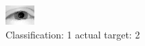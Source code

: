\begin{figure}[h!]
\begin{center}
\includegraphics[width=0.60\columnwidth]{figures/ID2316_class_1_target_2.png}
\end{center}
\caption{ Classification: 1 actual target: 2}
\label{fig:ID2316_class_1_target_2}
\end{figure}
